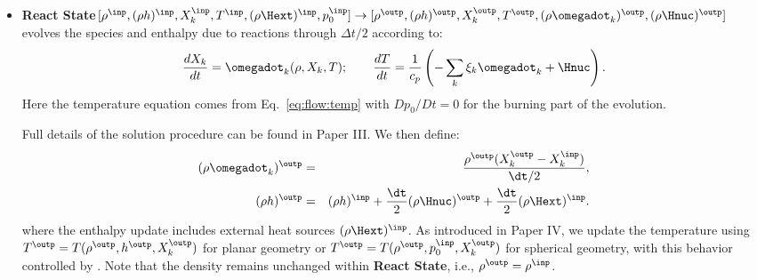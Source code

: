 \begin{itemize}
\item {\bf React State}$[\rho^{\inp},(\rho h)^{\inp},X_k^{\inp},T^{\inp}, (\rho\Hext)^{\inp},                                                      
  p_0^{\inp}] \rightarrow [\rho^{\outp}, (\rho h)^{\outp}, X_k^{\outp},                                   
  T^{\outp}, (\rho \omegadot_k)^{\outp}, (\rho\Hnuc)^{\outp}]$
  evolves the species and enthalpy due to reactions through
  $\Delta t/2$ according to:
\begin{equation}
\frac{dX_k}{dt} = \omegadot_k(\rho,X_k,T) ; \qquad
\frac{dT}{dt}   = \frac{1}{c_p} \left ( -\sum_k \xi_k  \omegadot_k  + \Hnuc \right ).
\end{equation}
Here the temperature equation comes from Eq.~\ref{eq:flow:temp} with $Dp_0/Dt = 0$ for
the burning part of the evolution.
  
Full details of the
solution procedure can be found in Paper III. We then define:
\begin{eqnarray}
(\rho\omegadot_k)^{\outp} &=& \frac{\rho^{\outp} ( X_k^{\outp} - X_k^{\inp})}{\dt/2}, \\
(\rho h)^{\outp} &=& (\rho h)^{\inp} + \frac{\dt}{2} (\rho\Hnuc)^{\outp} + \frac{\dt}{2} (\rho\Hext)^{\inp}.
\end{eqnarray}
where the enthalpy update includes external heat sources $(\rho\Hext)^{\inp}$.
As introduced in Paper IV, we update the temperature using $T^{\outp} = 
T(\rho^\outp,h^\outp,X_k^\outp)$ for planar geometry or $T^{\outp} =
T(\rho^\outp,p_0^\inp,X_k^\outp)$ for spherical geometry, with this behavior
controlled by .
Note that the density remains unchanged within {\bf React State}, i.e.,
$\rho^{\outp} = \rho^{\inp}$.



\end{itemize}
